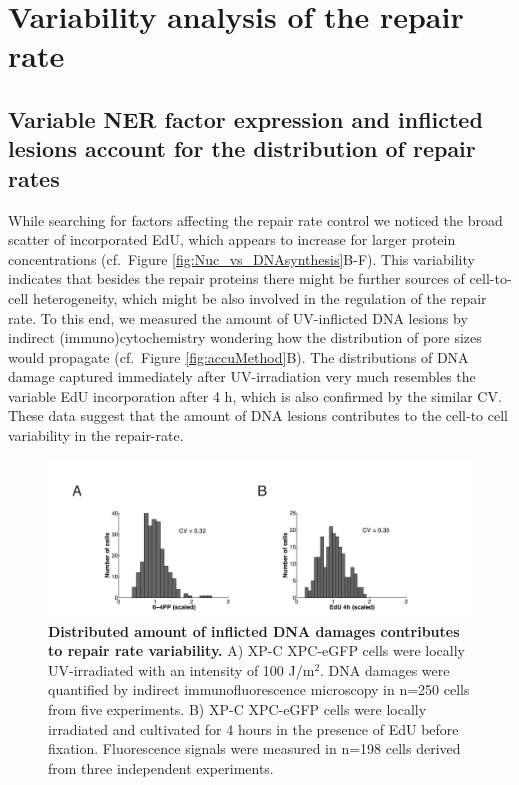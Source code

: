   


\section{Variability analysis of the repair rate}

\subsection{Variable NER factor expression and inflicted lesions account for the distribution of repair rates} 
\label{sec:variabilityAnalysis}
While searching for factors affecting the repair rate control we noticed the broad scatter of incorporated EdU, which appears to increase for larger protein concentrations (cf.\ Figure \ref{fig:Nuc_vs_DNAsynthesis}B-F). This variability indicates that besides the repair proteins there might be further sources of cell-to-cell heterogeneity, which might be also involved in the regulation of the repair rate. To this end, we measured the amount of UV-inflicted DNA lesions by indirect (immuno)cytochemistry wondering how the distribution of pore sizes would propagate (cf.\ Figure \ref{fig:accuMethod}B). The distributions of DNA damage captured immediately after UV-irradiation very much resembles the variable EdU incorporation after 4 h, which is also confirmed by the similar CV. These data suggest that the amount of DNA lesions contributes to the cell-to cell variability in the repair-rate.  


\begin{figure}[htbp]
	\begin{center}
		\includegraphics[width=1\textwidth]{Abbildungen/figure3_5.pdf}
		\caption{\textbf{Distributed amount of inflicted DNA damages contributes to repair rate variability.} A) XP-C XPC-eGFP cells were locally UV-irradiated with an intensity of 100 J/$\text{m}^\text{2}$. DNA damages were quantified by indirect immunofluorescence microscopy in n=250 cells from five experiments. B) XP-C XPC-eGFP cells were locally irradiated and cultivated for 4 hours in the presence of EdU before fixation. Fluorescence signals were measured in n=198 cells derived from three independent experiments. }
		\label{fig:DamageDist}
	\end{center}
\end{figure}

